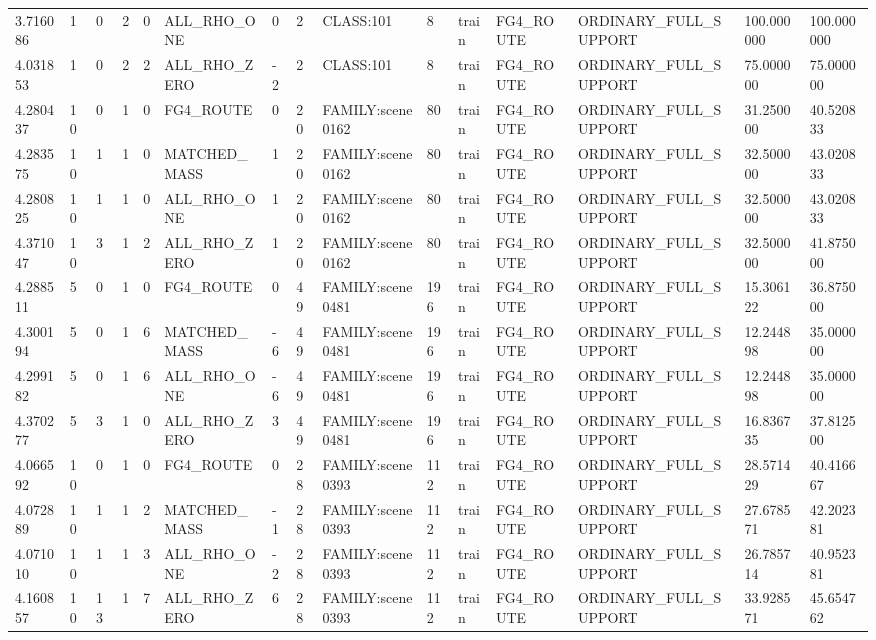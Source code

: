 \begin{tabular}{lllllllllllllll}
3.716086 & 1 & 0 & 2 & 0 & ALL\_RHO\_ONE & 0 & 2 & CLASS:101 & 8 & train & FG4\_ROUTE & ORDINARY\_FULL\_SUPPORT & 100.000000 & 100.000000 \\
4.031853 & 1 & 0 & 2 & 2 & ALL\_RHO\_ZERO & -2 & 2 & CLASS:101 & 8 & train & FG4\_ROUTE & ORDINARY\_FULL\_SUPPORT & 75.000000 & 75.000000 \\
4.280437 & 10 & 0 & 1 & 0 & FG4\_ROUTE & 0 & 20 & FAMILY:scene0162 & 80 & train & FG4\_ROUTE & ORDINARY\_FULL\_SUPPORT & 31.250000 & 40.520833 \\
4.283575 & 10 & 1 & 1 & 0 & MATCHED\_MASS & 1 & 20 & FAMILY:scene0162 & 80 & train & FG4\_ROUTE & ORDINARY\_FULL\_SUPPORT & 32.500000 & 43.020833 \\
4.280825 & 10 & 1 & 1 & 0 & ALL\_RHO\_ONE & 1 & 20 & FAMILY:scene0162 & 80 & train & FG4\_ROUTE & ORDINARY\_FULL\_SUPPORT & 32.500000 & 43.020833 \\
4.371047 & 10 & 3 & 1 & 2 & ALL\_RHO\_ZERO & 1 & 20 & FAMILY:scene0162 & 80 & train & FG4\_ROUTE & ORDINARY\_FULL\_SUPPORT & 32.500000 & 41.875000 \\
4.288511 & 5 & 0 & 1 & 0 & FG4\_ROUTE & 0 & 49 & FAMILY:scene0481 & 196 & train & FG4\_ROUTE & ORDINARY\_FULL\_SUPPORT & 15.306122 & 36.875000 \\
4.300194 & 5 & 0 & 1 & 6 & MATCHED\_MASS & -6 & 49 & FAMILY:scene0481 & 196 & train & FG4\_ROUTE & ORDINARY\_FULL\_SUPPORT & 12.244898 & 35.000000 \\
4.299182 & 5 & 0 & 1 & 6 & ALL\_RHO\_ONE & -6 & 49 & FAMILY:scene0481 & 196 & train & FG4\_ROUTE & ORDINARY\_FULL\_SUPPORT & 12.244898 & 35.000000 \\
4.370277 & 5 & 3 & 1 & 0 & ALL\_RHO\_ZERO & 3 & 49 & FAMILY:scene0481 & 196 & train & FG4\_ROUTE & ORDINARY\_FULL\_SUPPORT & 16.836735 & 37.812500 \\
4.066592 & 10 & 0 & 1 & 0 & FG4\_ROUTE & 0 & 28 & FAMILY:scene0393 & 112 & train & FG4\_ROUTE & ORDINARY\_FULL\_SUPPORT & 28.571429 & 40.416667 \\
4.072889 & 10 & 1 & 1 & 2 & MATCHED\_MASS & -1 & 28 & FAMILY:scene0393 & 112 & train & FG4\_ROUTE & ORDINARY\_FULL\_SUPPORT & 27.678571 & 42.202381 \\
4.071010 & 10 & 1 & 1 & 3 & ALL\_RHO\_ONE & -2 & 28 & FAMILY:scene0393 & 112 & train & FG4\_ROUTE & ORDINARY\_FULL\_SUPPORT & 26.785714 & 40.952381 \\
4.160857 & 10 & 13 & 1 & 7 & ALL\_RHO\_ZERO & 6 & 28 & FAMILY:scene0393 & 112 & train & FG4\_ROUTE & ORDINARY\_FULL\_SUPPORT & 33.928571 & 45.654762 \\

\end{tabular}
